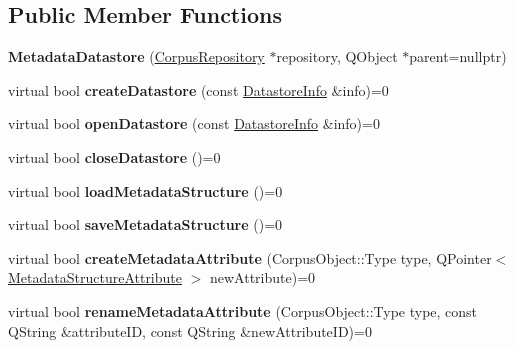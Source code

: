 \subsection*{Public Member Functions}
\begin{DoxyCompactItemize}
\item 
\mbox{\label{class_metadata_datastore_adda07ed23e819dc3dbb5481ae93b94c4}} 
{\bfseries Metadata\+Datastore} (\hyperlink{class_corpus_repository}{Corpus\+Repository} $\ast$repository, Q\+Object $\ast$parent=nullptr)
\item 
\mbox{\label{class_metadata_datastore_a821365e77d482c6bff0c5df929f9b75e}} 
virtual bool {\bfseries create\+Datastore} (const \hyperlink{class_datastore_info}{Datastore\+Info} \&info)=0
\item 
\mbox{\label{class_metadata_datastore_aaa160cdca3170cb4386e4a1742153c13}} 
virtual bool {\bfseries open\+Datastore} (const \hyperlink{class_datastore_info}{Datastore\+Info} \&info)=0
\item 
\mbox{\label{class_metadata_datastore_a54f50954312387db4e7b5adb8d6791b0}} 
virtual bool {\bfseries close\+Datastore} ()=0
\item 
\mbox{\label{class_metadata_datastore_a55e71557cb3c20955b66204f76c8aa92}} 
virtual bool {\bfseries load\+Metadata\+Structure} ()=0
\item 
\mbox{\label{class_metadata_datastore_ad41e0ce60ad0794aee9f29cb0be34b97}} 
virtual bool {\bfseries save\+Metadata\+Structure} ()=0
\item 
\mbox{\label{class_metadata_datastore_ad19783eebba214db121ec208264bd667}} 
virtual bool {\bfseries create\+Metadata\+Attribute} (Corpus\+Object\+::\+Type type, Q\+Pointer$<$ \hyperlink{class_metadata_structure_attribute}{Metadata\+Structure\+Attribute} $>$ new\+Attribute)=0
\item 
\mbox{\label{class_metadata_datastore_a7f88911ff51aabf2513770ee89aee1c2}} 
virtual bool {\bfseries rename\+Metadata\+Attribute} (Corpus\+Object\+::\+Type type, const Q\+String \&attribute\+ID, const Q\+String \&new\+Attribute\+ID)=0

\end{DoxyCompactItemize}
